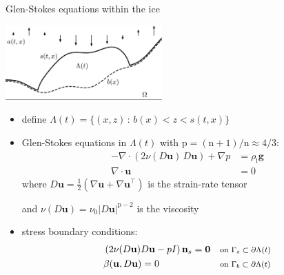 \documentclass[10pt,svgnames]{beamer}
\newcommand{\bg}{\mathbf{g}}
\newcommand{\bn}{\mathbf{n}}
\newcommand{\bu}{\mathbf{u}}
\newcommand{\bzero}{\bm{0}}
\newcommand{\nn}{\mathrm{n}}
\newcommand{\pp}{\mathrm{p}}
\newcommand{\grad}{\nabla}
\newcommand{\rhoi}{\rho_{\text{i}}}
\newcommand{\where}[1]{\text{\footnotesize #1}}
\newcommand{\aler}[1]{{\color{FireBrick} #1}}
\begin{document}
\begin{frame}{Glen-Stokes equations within the ice}

\hfill \includegraphics[width=0.45\textwidth]{stokesdomain.png}

\begin{itemize}
\item define \aler{${\displaystyle \Lambda(t) = \{(x,z)\,:\,b(x)<z<s(t,x)\}}$}
\item Glen-Stokes equations in $\Lambda(t)$ with $\pp = (\nn + 1)/\nn \approx 4/3$:
\begin{align*}
- \nabla \cdot \left(2 \nu(D\bu)\, D\bu\right) + \nabla p &= \rhoi \bg  \\
\nabla \cdot \bu &= 0
\end{align*}
where $D\bu = \frac{1}{2}\left(\grad\bu + \grad\bu^\top\right)$ is the strain-rate tensor

and $\nu(D\bu) = \nu_0 |D\bu|^{\pp-2}$ is the viscosity
\item stress boundary conditions:
\begin{align*}
&\left(2 \nu(D\bu) D\bu - pI\right) \bn_s = \bzero   && \where{on $\Gamma_s \subset \partial\Lambda(t)$} \\
&\beta(\bu,D\bu)=0 && \where{on $\Gamma_b \subset \partial\Lambda(t)$}
\end{align*}
\end{itemize}
\end{frame}


\newcommand{\stdblock}{
\begin{align*}
s - b &\ge 0 & &\where{in $\Omega$} \\
\frac{\partial s}{\partial t} - \bu|_s \cdot \bn_s - a &\ge 0 \\
(s - b) \left(\frac{\partial s}{\partial t} - \bu|_s \cdot \bn_s - a\right) &= 0 \\
- \nabla \cdot \left(2 \nu_0 |D\bu|^{\pp-2}\, D\bu\right) + \nabla p &= \rhoi \bg && \where{in $\Lambda(t)$} \\
\nabla \cdot \bu &= 0 \\
\left(2 \nu_0 |D\bu|^{\pp-2} D\bu - pI\right) \bn_s &= \bzero && \where{on $\Gamma_s \subset \partial\Lambda(t)$} \\
\beta(\bu,D\bu) &= 0 && \where{on $\Gamma_b \subset \partial\Lambda(t)$}
\end{align*}
}
\end{document}
